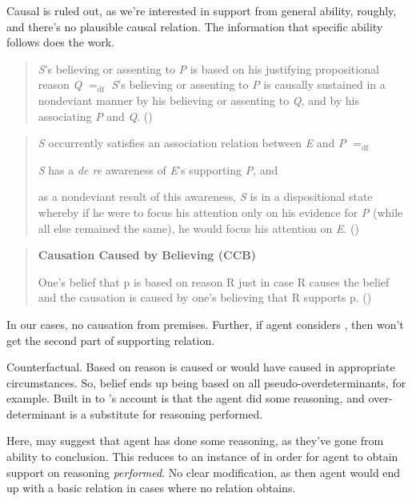 \begin{note}[Causal]
  Causal is ruled out, as we're interested in support from general ability, roughly, and there's no plausible causal relation.
  The information that specific ability follows does the work.

  \cite{Moser:1989tv}
  \begin{quote}
    \emph{S}'s believing or assenting to \emph{P} is based on his justifying propositional reason \emph{Q} \(=_{\text{df}}\) \emph{S}'s believing or assenting to \emph{P} is causally sustained in a nondeviant manner by his believing or assenting to \emph{Q}, and by his associating \emph{P} and \emph{Q}.\nolinebreak
    \mbox{}\hfill\mbox{(\citeyear[157]{Moser:1989tv})}
  \end{quote}

  \begin{quote}
    \emph{S} occurrently satisfies an association relation between \emph{E} and \emph{P} \(=_{\text{df}}\)
    \begin{enumerate*}[label=(\roman*)]
    \item \emph{S} has a \emph{de re} awareness of \emph{E}'s supporting \emph{P}, and
    \item as a nondeviant result of this awareness, \emph{S} is in a dispositional state whereby if he were to focus his attention only on his evidence for \emph{P} (while all else remained the same), he would focus his attention on \emph{E}.
      \newline
      \mbox{}\hfill\mbox{(\citeyear[141--142]{Moser:1989tv})}
    \end{enumerate*}
  \end{quote}

  \cite{Ye:2020ux}
  \begin{quote}
    \textbf{Causation Caused by Believing (CCB)}

    One's belief that p is based on reason R just in case R causes the belief and the causation is caused by one's believing that R supports p.
    \newline
    \mbox{}\hfill\mbox{(\citeyear[27]{Ye:2020ux})}
  \end{quote}
  In our cases, no causation from premises.
  Further, if agent considers \nI{}, then won't get the second part of supporting relation.
\end{note}

\begin{note}[Counterfactual]
  Counterfactual.
  Based on reason is caused or would have caused in appropriate circumstances.
  So, belief ends up being based on all pseudo-overdeterminants, for example.
  Built in to \citeauthor{Swain:1981wd}'s account is that the agent did some reasoning, and over-determinant is a substitute for reasoning performed.

  Here, may suggest that agent has done some reasoning, as they've gone from ability to conclusion.
  This reduces to an instance of \AR{} in order for agent to obtain support on reasoning \emph{performed}.
  No clear modification, as then agent would end up with a basic relation in cases where no relation obtains.
\end{note}

